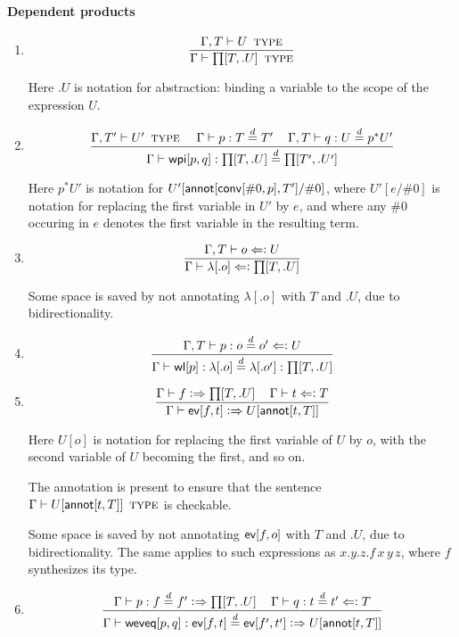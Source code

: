 \documentclass[11pt]{article}
\newcommand{\eqd}{\stackrel{d}{=}}
\newcommand{\spc}{{\,\,\,\,\,\,\,}}
\newcommand{\synth}{\vcentcolon\Rightarrow}
\newcommand{\ccheck}{\Leftarrow\vcentcolon}
\newcommand{\Type}{\mathop{\text{ \sc type}}}
\newcommand{\ha}[2]{#1[#2]}
\newcommand{\annot}{{\sf annot}}
\newcommand{\conv}{{\sf conv}}
\newcommand{\ev}{{\sf ev}}
\newcommand{\weveq}{{\sf weveq}}
\newcommand{\wl}{{\sf wl}}
\newcommand{\wpi}{{\sf wpi}}
\begin{document}
\paragraph{Dependent products}

\begin{enumerate}

\item 
$$\frac{\Gamma, T\vdash U\Type}{\Gamma\vdash \ha\prod{T,.U}\Type}$$

Here $.U$ is notation for abstraction: binding a variable to the scope of the expression $U$.

\item 
$$ \frac{ 
  \Gamma, T' \vdash U'  \Type      \spc 
  \Gamma     \vdash p:T \eqd T'    \spc
  \Gamma, T  \vdash q:U \eqd p^*U'
  } {
  \Gamma     \vdash \ha\wpi{p,q}:\ha\prod{T,.U}\eqd \ha\prod{T',.U'}
}$$

Here ${p}^*U'$ is notation for $U'[\ha\annot{\ha\conv{\#0,p},T'}/\#0]$, where
$U'[e/\#0]$ is notation for replacing the first variable in $U'$ by $e$, and
where any $\#0$ occuring in $e$ denotes the first variable in the resulting
term.

\item 
$$\frac{\Gamma, T\vdash o \ccheck U}{\Gamma\vdash \ha\lambda{.o} \ccheck \ha\prod{T,.U}}$$

Some space is saved by not annotating $\ha\lambda{.o}$ with $T$ and $.U$, due to bidirectionality.

\item 
$$\frac{\Gamma, T\vdash p : o\eqd o' \ccheck U}{\Gamma\vdash \ha\wl{p} : \ha\lambda{.o}\eqd \ha\lambda{.o'} : \ha\prod{T,.U}}$$

\item 
$$\frac{\Gamma\vdash f \synth \ha\prod{T,.U}\spc \Gamma\vdash t \ccheck T}{\Gamma\vdash \ha\ev{f,t} \synth U[\ha\annot{t,T}]}$$

Here $U[o]$ is notation for replacing the first variable of $U$ by $o$, with
the second variable of $U$ becoming the first, and so on.  

The annotation is present to ensure that the sentence $\Gamma \vdash
U[\ha\annot{t,T}] \Type$ is checkable.

Some space is saved by not annotating $\ha\ev{f,o}$ with $T$ and $.U$, due to
bidirectionality.  The same applies to such expressions as $x.y.z.f\, x\, y\,
z$, where $f$ synthesizes its type.

\item 
$$\frac{
   \Gamma\vdash p : f \eqd f' \synth \ha\prod{T,.U}\spc 
   \Gamma\vdash q : t \eqd t' \ccheck T
   }{
   \Gamma\vdash \ha\weveq{p,q} : \ha\ev{f,t} \eqd \ha\ev{f',t'} \synth U[\ha\annot{t,T}]
  }$$


\end{enumerate}
\end{document}

